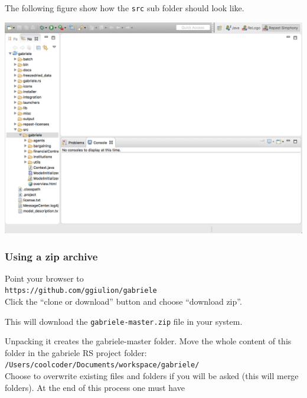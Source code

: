 \documentclass{book}
\begin{document}
The following figure show how the \verb+src+ sub folder should look like.

\vskip2mm
\noindent
\includegraphics[scale=0.35]{fig_gabriele_rs_navigation1}

\vskip2mm

\subsubsection{Using a zip archive}
Point your browser to\\ 
\verb+https://github.com/ggiulion/gabriele+\\
Click the ``clone or download'' button and choose ``download zip''.

This will download the \verb+gabriele-master.zip+ file in your system.

Unpacking it creates the gabriele-master folder.
Move the whole content of this folder in the gabriele RS project folder:\\  
\verb+/Users/coolcoder/Documents/workspace/gabriele/+\\
Choose to overwrite existing files and folders if you will be asked (this will merge folders). 
\iffalse
At the end of this process one must have
\end{document}
